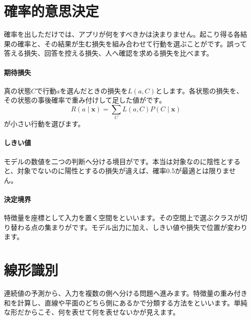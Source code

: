 \par
\endgroup
\par
\endgroup


\section{確率的意思決定}
\label{sec:06-machine-learning-13}

確率を出しただけでは、アプリが何をすべきかは決まりません。起こり得る各結果の確率と、その結果が生む損失を組み合わせて行動を選ぶことがです。誤って答える損失、回答を控える損失、人へ確認を求める損失を比べます。

\begingroup
\begingroup
\paragraph{期待損失}
        真の状態$C$で行動$a$を選んだときの損失を$L(a,C)$とします。各状態の損失を、その状態の事後確率で重み付けして足した値がです。
        \[
          R(a\mid\mathbf{x})=
          \sum_C L(a,C)P(C\mid\mathbf{x})
        \]
        が小さい行動を選びます。

\par
\endgroup
\medskip
\begingroup
\paragraph{しきい値}
        モデルの数値を二つの判断へ分ける境目がです。本当は対象なのに陰性とすると、対象でないのに陽性とするの損失が違えば、確率0.5が最適とは限りません。

\paragraph{決定境界}
        特徴量を座標として入力を置く空間をといいます。その空間上で選ぶクラスが切り替わる点の集まりがです。モデル出力に加え、しきい値や損失で位置が変わります。

\par
\endgroup
\par
\endgroup


\section{線形識別}
\label{sec:06-machine-learning-14}

連続値の予測から、入力を複数の側へ分ける問題へ進みます。特徴量の重み付き和を計算し、直線や平面のどちら側にあるかで分類する方法をといいます。単純な形だからこそ、何を表せて何を表せないかが見えます。

